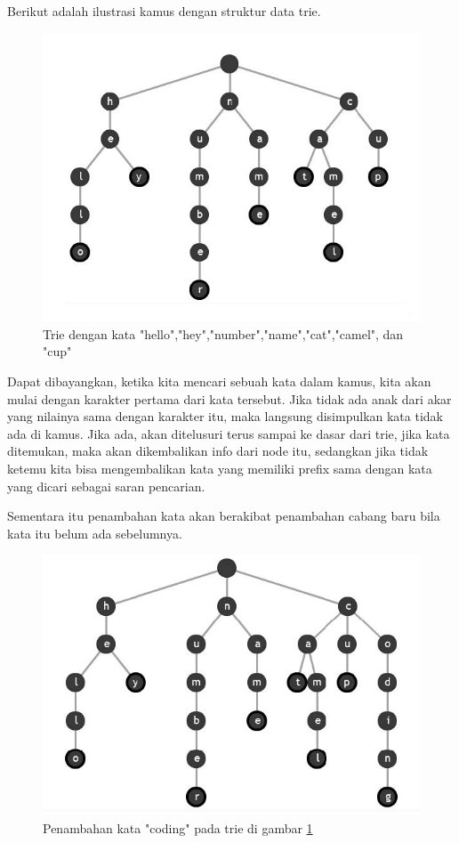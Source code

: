 Berikut adalah ilustrasi kamus dengan struktur data trie.

\begin{figure}[H]
\centering
\includegraphics[scale=1.25]{Gambar/contoh-trie-2}
\caption[Trie]{Trie dengan kata "hello","hey","number","name","cat","camel", dan "cup"\cite{najogie:10:trie}} 
\label{contoh-trie-2}
\end{figure}

Dapat dibayangkan, ketika kita mencari sebuah kata dalam kamus, kita akan mulai dengan karakter pertama dari kata tersebut. Jika tidak ada anak dari akar yang nilainya sama dengan karakter itu, maka langsung disimpulkan kata tidak ada di kamus. Jika ada, akan ditelusuri terus sampai ke dasar dari trie, jika kata ditemukan, maka akan dikembalikan info dari node itu, sedangkan jika tidak ketemu kita bisa mengembalikan kata yang memiliki prefix sama dengan kata yang dicari sebagai saran pencarian.

Sementara itu penambahan kata akan berakibat penambahan cabang baru bila kata itu belum ada sebelumnya.

\begin{figure}[H]
\centering
\includegraphics[scale=1.25]{Gambar/contoh-trie-3}
\caption[Trie]{Penambahan kata "coding" pada trie di gambar \ref{contoh-trie-2}\cite{najogie:10:trie}} 
\label{contoh-trie-3}
\end{figure}

